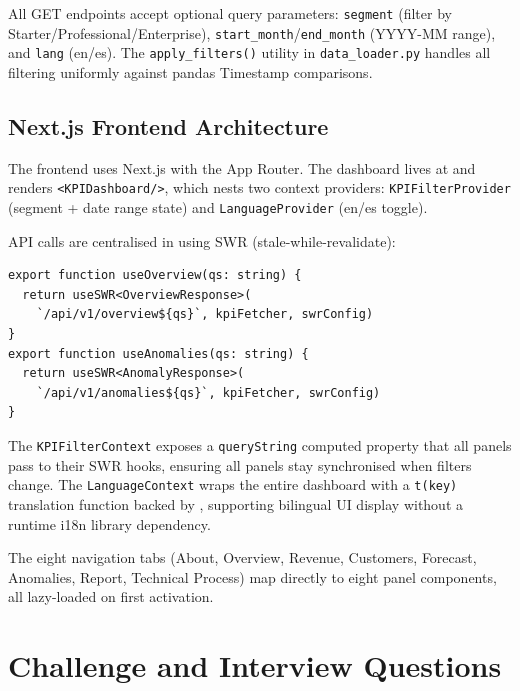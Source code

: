 All GET endpoints accept optional query parameters: \texttt{segment} (filter by Starter/Professional/Enterprise), \texttt{start\_month}/\texttt{end\_month} (YYYY-MM range), and \texttt{lang} (en/es). The \texttt{apply\_filters()} utility in \texttt{data\_loader.py} handles all filtering uniformly against pandas Timestamp comparisons.

\subsection{Next.js Frontend Architecture}

The frontend uses Next.js with the App Router. The dashboard lives at  and renders \texttt{<KPIDashboard/>}, which nests two context providers: \texttt{KPIFilterProvider} (segment + date range state) and \texttt{LanguageProvider} (en/es toggle).

API calls are centralised in  using SWR (stale-while-revalidate):

\begin{lstlisting}[style=typescript, caption={SWR hooks for KPI API in useKPIAPI.ts.}]
export function useOverview(qs: string) {
  return useSWR<OverviewResponse>(
    `/api/v1/overview${qs}`, kpiFetcher, swrConfig)
}
export function useAnomalies(qs: string) {
  return useSWR<AnomalyResponse>(
    `/api/v1/anomalies${qs}`, kpiFetcher, swrConfig)
}
\end{lstlisting}

The \texttt{KPIFilterContext} exposes a \texttt{queryString} computed property that all panels pass to their SWR hooks, ensuring all panels stay synchronised when filters change. The \texttt{LanguageContext} wraps the entire dashboard with a \texttt{t(key)} translation function backed by , supporting bilingual UI display without a runtime i18n library dependency.

The eight navigation tabs (About, Overview, Revenue, Customers, Forecast, Anomalies, Report, Technical Process) map directly to eight panel components, all lazy-loaded on first activation.

\section{Challenge and Interview Questions}
\label{sec:kpi-challenges}

